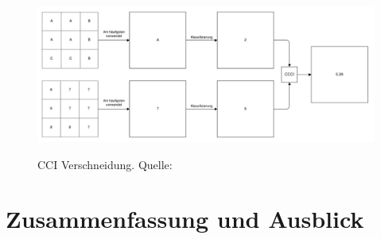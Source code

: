 \documentclass[10pt,conference,compsocconf]{IEEEtran}
\begin{document}
\begin{figure}[H]
	\centering
	\includegraphics[width=1\columnwidth]{img/CCI_Verschneidung.png} \\
	\caption[]{CCI Verschneidung. Quelle: \cite{mariuszMaster}}
	\label{img:CCIVerschneidung}
\end{figure}



\section{Zusammenfassung und Ausblick}




\end{document}
